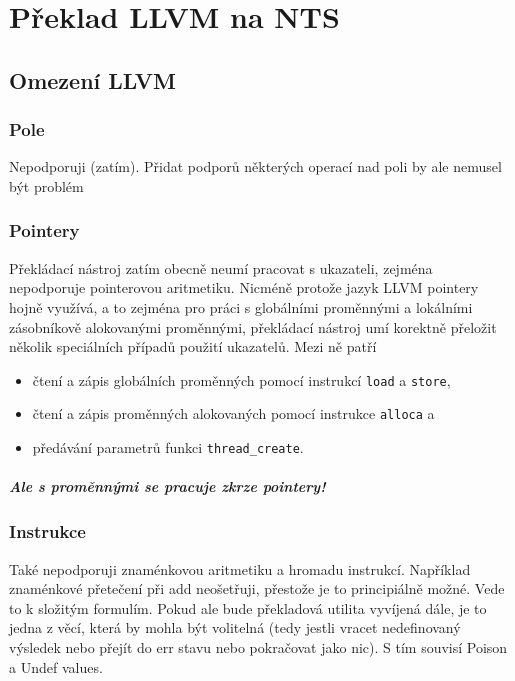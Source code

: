 \documentclass[10pt,a4paper,notitlepage]{report}
\begin{document}
\chapter{Překlad LLVM na NTS}
\section{Omezení LLVM}

\subsection{Pole}
Nepodporuji (zatím). Přidat podporů některých operací nad poli by ale nemusel být problém

\subsection{Pointery}
Překládací nástroj zatím obecně neumí pracovat s ukazateli, zejména nepodporuje pointerovou aritmetiku. Nicméně protože jazyk LLVM pointery hojně využívá, a to zejména pro práci s globálními proměnnými a lokálními zásobníkově alokovanými proměnnými, překládací nástroj umí korektně přeložit několik speciálních případů použití ukazatelů. Mezi ně patří
\begin{itemize}
\item čtení a zápis globálních proměnných pomocí instrukcí \texttt{load} a \texttt{store},
\item čtení a zápis proměnných alokovaných pomocí instrukce \texttt{alloca} a
\item předávání parametrů funkci \texttt{thread\_create}.
\end{itemize}
\paragraph{Ale s proměnnými se pracuje zkrze pointery!}

\subsection{Instrukce}
Také nepodporuji znaménkovou aritmetiku a hromadu instrukcí. Například znaménkové přetečení při add neošetřuji, přestože je to principiálně možné. Vede to k složitým formulím. Pokud ale bude překladová utilita vyvíjená dále, je to jedna z věcí, která by mohla být volitelná (tedy jestli vracet nedefinovaný výsledek nebo přejít do err stavu nebo pokračovat jako nic). S tím souvisí Poison a Undef values.
\end{document}
